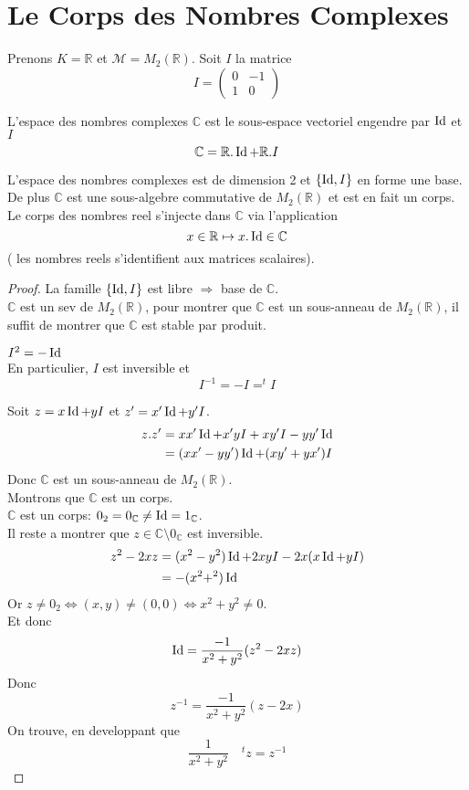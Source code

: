 \documentclass[../main.tex]{subfiles}
\begin{document}
\section{Le Corps des Nombres Complexes}
Prenons $K= \mathbb{R}$ et $\mathcal{M} = M_2( \mathbb{R}) $. Soit $I$ la matrice
\[ 
I = 
\begin{pmatrix}
	0 & -1\\
	1 & 0
\end{pmatrix}
\]
\begin{defn}
L'espace des nombres complexes $\mathbb{C}$ est le sous-espace vectoriel engendre par $\operatorname*{Id}$ et $I$ 
\[ 
\mathbb{C} = \mathbb{R}.\operatorname*{Id} + \mathbb{R}.I
\]

\end{defn}
\begin{thm}
L'espace des nombres complexes est de dimension 2 et $ \left\{ \operatorname*{Id}, I \right\} $ en forme une base.\\
De plus $\mathbb{C}$ est une sous-algebre commutative de $M_2( \mathbb{R}) $ et est en fait un corps. Le corps des nombres reel s'injecte dans $\mathbb{C}$ via l'application
\[ 
x \in \mathbb{R} \mapsto x. \operatorname*{Id} \in \mathbb{C}
\]
( les nombres reels s'identifient aux matrices scalaires).
\end{thm}
\begin{proof}
La famille $ \left\{ \operatorname*{Id}, I \right\} $ est libre $\Rightarrow$ base de $\mathbb{C}$.\\
$\mathbb{C}$ est un sev de  $M_2( \mathbb{R}) $, pour montrer que $\mathbb{C}$ est un sous-anneau de $M_2( \mathbb{R}) $, il suffit de montrer que $\mathbb{C}$ est stable par produit.

\begin{rmq}
$I^{2} = - \operatorname*{Id}$ \\
En particulier, $I$ est inversible et
\[ 
	I^{-1} = -I = ^{t}I
\]

\end{rmq}
Soit  $z= x \operatorname*{Id} + y I$ et $z'=x'\operatorname*{Id} + y'I$.
\begin{align*}
	z.z' &= xx'\operatorname*{Id} + x'yI + xy'I - yy'\operatorname*{Id}\\
	     &= ( xx'-yy') \operatorname*{Id} + ( xy' + yx') I
\end{align*}
Donc $\mathbb{C}$ est un sous-anneau de $M_2( \mathbb{R}) $.\\
Montrons que $\mathbb{C}$ est un corps.\\
$\mathbb{C}$ est un corps: $0_2 = 0_{\mathbb{C}}\neq \operatorname*{Id} = 1_{\mathbb{C}}  $.\\
Il reste a montrer que $z \in \mathbb{C}\setminus 0_{\mathbb{C}} $ est inversible.
\begin{align*}
	z^{2} - 2xz &= ( x^{2}-y^{2}) \operatorname*{Id} + 2xy I - 2x( x\operatorname*{Id}+ yI) \\
		    &= -( x^{2} + ^{2}) \operatorname*{Id}
\end{align*}
Or $z \neq 0_2 \iff ( x,y) \neq ( 0,0) \iff x^{2}+y^{2}\neq 0$.\\
Et donc
\[ 
	\operatorname*{Id} = \frac{-1}{x^{2}+y^{2}}( z^{2}-2xz) 
\]
Donc
\[ 
	z^{-1}= \frac{-1}{x^{2}+y^{2}}( z-2x) 
\]
On trouve, en developpant que
\[ 
\frac{1}{x^{2}+y^{2}}  \quad ^{t}z = z^{-1}
\]
\end{proof}
\end{document}
